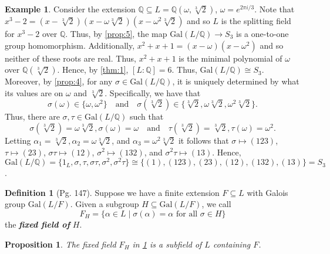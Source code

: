 \documentclass[leqno]{article}
\theoremstyle{definition}
\newtheorem{prop}{Proposition}
\newtheorem{definition}{Definition}
\theoremstyle{remark}
\theoremstyle{definition}
\newtheorem{example}{Example}
\begin{document}
    \begin{example}\label{ex:4}
        Consider the extension $\mathbb{Q}\subseteq L=\mathbb{Q}(\omega,\sqrt[3]{2})$, $\omega=e^{2\pi i/3}$. Note that $x^3-2=(x-\sqrt[3]{2})(x-\omega\sqrt[3]{2})(x-\omega^2\sqrt[3]{2})$ and so $L$ is the splitting field for $x^3-2$ over $\mathbb{Q}$. Thus, by \cref{prop:5}, the map $\text{Gal}(L/\mathbb{Q})\rightarrow S_3$ is a one-to-one group homomorphism. Additionally, $x^2+x+1=(x-\omega)(x-\omega^2)$ and so neither of these roots are real. Thus, $x^2+x+1$ is the minimal polynomial of $\omega$ over $\mathbb{Q}(\sqrt[3]{2})$. Hence, by \cref{thm:1}, $[L\colon\mathbb{Q}]=6$. Thus, $\text{Gal}(L/\mathbb{Q})\cong S_3$. Moreover, by \cref{prop:4}, for any $\sigma\in\text{Gal}(L/\mathbb{Q})$, it is uniquely determined by what its values are on $\omega$ and $\sqrt[3]{2}$. Specifically, we have that
            \begin{equation*}
                \sigma(\omega)\in\{\omega,\omega^2\}\quad\text{and}\quad\sigma(\sqrt[3]{2})\in\{\sqrt[3]{2},\omega\sqrt[3]{2},\omega^2\sqrt[3]{2}\}.
            \end{equation*}
        Thus, there are $\sigma,\tau\in\text{Gal}(L/\mathbb{Q})$ such that 
            \begin{equation*}
                \sigma(\sqrt[3]{2})=\omega\sqrt[3]{2}, \sigma(\omega)=\omega\quad\text{and}\quad\tau(\sqrt[3]{2})=\sqrt[3]{2},\tau(\omega)=\omega^2.
            \end{equation*}
        Letting $\alpha_1=\sqrt[3]{2},\alpha_2=\omega\sqrt[3]{2}$, and $\alpha_3=\omega^2\sqrt[3]{2}$ it follows that $\sigma\mapsto (123)$, $\tau\mapsto(23)$, $\sigma\tau\mapsto(12)$, $\sigma^2\mapsto(132)$, and $\sigma^2\tau\mapsto(13)$. Hence, $\text{Gal}(L/\mathbb{Q})=\{1_L,\sigma,\tau,\sigma\tau,\sigma^2,\sigma^2\tau\}\cong\{(1),(123),(23),(12),(132),(13)\}=S_3$.
    \end{example}
    \begin{definition}[Pg. 147]\label{def:11}
        Suppose we have a finite extension $F\subseteq L$ with Galois group $\text{Gal}(L/F)$. Given a subgroup $H\subseteq \text{Gal}(L/F)$, we call
            \begin{equation*}
                F_H=\{\alpha\in L\mid \sigma(\alpha)=\alpha\text{ for all }\sigma\in H\}
            \end{equation*}
        the \textbf{\textit{fixed field of}} $H$.
    \end{definition}
    \begin{prop}\label{prop:7}
        \textit{The fixed field $F_H$ in \cref{def:11} is a subfield of $L$ containing $F$.}
    \end{prop}
\end{document}
